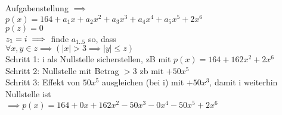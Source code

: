 Aufgabenstellung \(\implies\) \\
\(p(x)=164+a_{1}x+a_{2}x^2+a_{3}x^3+a_{4}x^4+a_{5}x^5+2x^6\) \\
\(p(z)= 0\)\\
\(z_1 = i \\ \implies\) finde \(a_{1..5}\) so, dass \\
\(\forall x,y \in z \implies (| x | > 3 \implies | y | \leq z)  \)\\
Schritt 1: i als Nullstelle sicherstellen, zB mit \(p(x)=164+162x^2+2x^6\)\\
Schritt 2: Nullstelle mit Betrag \(> 3\) zb mit \(+ 50x^5\)\\
Schritt 3: Effekt von \(50x^5\) ausgleichen (bei i) mit \(+ 50x^3\), damit i weiterhin Nullstelle ist\\
\(\implies p(x)=164+0x+162x^2-50x^3-0x^4-50x^5+2x^6\)
